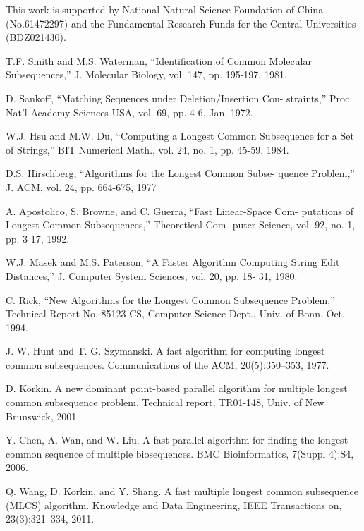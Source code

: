 \documentclass{article}
\begin{document}
This work is supported by National Natural Science Foundation of China
(No.61472297) and the Fundamental Research Funds for the Central
Universities (BDZ021430).


\begin{thebibliography}{99}

 T.F. Smith and M.S. Waterman, “Identification of
  Common Molecular Subsequences,” J. Molecular Biology, vol. 147,
  pp. 195-197, 1981.

 D. Sankoff, “Matching Sequences under
Deletion/Insertion Con- straints,” Proc. Nat’l Academy Sciences USA,
vol. 69, pp. 4-6, Jan.  1972.

 W.J. Hsu and M.W. Du, “Computing a Longest Common
  Subsequence for a Set of Strings,” BIT Numerical Math., vol. 24,
  no. 1, pp. 45-59, 1984.

 D.S. Hirschberg, “Algorithms for the Longest Common Subse-
quence Problem,” J. ACM, vol. 24, pp. 664-675, 1977

 A. Apostolico, S. Browne, and C. Guerra,
  “Fast Linear-Space Com- putations of Longest Common Subsequences,”
  Theoretical Com- puter Science, vol. 92, no. 1, pp. 3-17, 1992.

 W.J. Masek and M.S. Paterson, “A Faster Algorithm
  Computing String Edit Distances,” J. Computer System Sciences,
  vol. 20, pp. 18- 31, 1980.

 C. Rick, “New Algorithms for the Longest Common
  Subsequence Problem,” Technical Report No. 85123-CS, Computer
  Science Dept., Univ. of Bonn, Oct. 1994.
  
 J. W. Hunt and T. G. Szymanski. A fast algorithm
  for computing longest common subsequences.  Communications of the
  ACM, 20(5):350–353, 1977.

 D. Korkin. A new dominant point-based parallel
  algorithm for multiple longest common subsequence problem. Technical
  report, TR01-148, Univ. of New Brunswick, 2001

 Y. Chen, A. Wan, and W. Liu. A fast parallel
algorithm for finding the longest common sequence of
multiple biosequences. BMC Bioinformatics, 7(Suppl
4):S4, 2006.

 Q. Wang, D. Korkin, and Y. Shang. A fast multiple
longest common subsequence (MLCS) algorithm.  Knowledge and Data
Engineering, IEEE Transactions on, 23(3):321–334, 2011.


\end{thebibliography}
\end{document}

